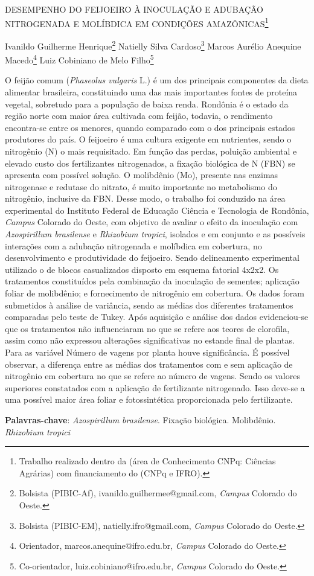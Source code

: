 \documentclass[article,12pt,onesidea,4paper,english,brazil]{abntex2}
\begin{document}
	
	
	\frenchspacing 
	
	\begin{center}
		\LARGE DESEMPENHO DO FEIJOEIRO À INOCULAÇÃO E ADUBAÇÃO NITROGENADA
		E MOLÍBDICA EM CONDIÇÕES AMAZÔNICAS\footnote{Trabalho realizado dentro da (área de Conhecimento CNPq: Ciências Agrárias) com financiamento do (CNPq e IFRO).}
		
		\normalsize
		Ivanildo Guilherme Henrique\footnote{Bolsista (PIBIC-Af), ivanildo.guilhermee@gmail.com, \textit{Campus} Colorado do Oeste.} 
		Natielly Silva Cardoso\footnote{Bolsista (PIBIC-EM), natielly.ifro@gmail.com, \textit{Campus} Colorado do Oeste.} 
		Marcos Aurélio Anequine Macedo\footnote{Orientador, marcos.anequine@ifro.edu.br, \textit{Campus} Colorado do Oeste.} 
		Luiz Cobiniano de Melo Filho\footnote{Co-orientador, luiz.cobiniano@ifro.edu.br, \textit{Campus} Colorado do Oeste.} 
	\end{center}
	
	\noindent O feijão comum (\textit{Phaseolus vulgaris} L.) é um dos principais componentes da dieta alimentar brasileira, constituindo uma das mais importantes fontes de proteína
	vegetal, sobretudo para a população de baixa renda. Rondônia é o estado da região
	norte com maior área cultivada com feijão, todavia, o rendimento encontra-se entre
	os menores, quando comparado com o dos principais estados produtores do país. O
	feijoeiro é uma cultura exigente em nutrientes, sendo o nitrogênio (N) o mais
	requisitado. Em função das perdas, poluição ambiental e elevado custo dos
	fertilizantes nitrogenados, a fixação biológica de N (FBN) se apresenta com possível
	solução. O molibdênio (Mo), presente nas enzimas nitrogenase e redutase do
	nitrato, é muito importante no metabolismo do nitrogênio, inclusive da FBN. Desse
	modo, o trabalho foi conduzido na área experimental do Instituto Federal de
	Educação Ciência e Tecnologia de Rondônia, \textit{Campus} Colorado do Oeste, com
	objetivo de avaliar o efeito da inoculação com \textit{Azospirillum brasilense} e \textit{Rhizobium tropici}, isolados e em conjunto e as possíveis interações com a adubação
	nitrogenada e molíbdica em cobertura, no desenvolvimento e produtividade do
	feijoeiro. Sendo delineamento experimental utilizado o de blocos casualizados
	disposto em esquema fatorial 4x2x2. Os tratamentos constituídos pela combinação
	da inoculação de sementes; aplicação foliar de molibdênio; e fornecimento de
	nitrogênio em cobertura. Os dados foram submetidos à análise de variância, sendo
	as médias dos diferentes tratamentos comparadas pelo teste de Tukey. Após
	aquisição e análise dos dados evidenciou-se que os tratamentos não influenciaram
	no que se refere aos teores de clorofila, assim como não expressou alterações
	significativas no estande final de plantas. Para as variável Número de vagens por
	planta houve significância. É possível observar, a diferença entre as médias dos
	tratamentos com e sem aplicação de nitrogênio em cobertura no que se refere ao
	número de vagens. Sendo os valores superiores constatados com a aplicação de
	fertilizante nitrogenado. Isso deve-se a uma possível maior área foliar e
	fotossintética proporcionada pelo fertilizante.
	
	\vspace{\onelineskip}
	
	\noindent
	\textbf{Palavras-chave}: \textit{Azospirillum brasilense}. Fixação biológica. Molibdênio. \textit{Rhizobium tropici}
	
\end{document}
